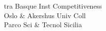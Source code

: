 \documentclass[a4paper]{article}
\begin{document}
\begin{multicols*}{2}
\begin{footnotesize}
tra Basque Inst Competitiveness \\ Oslo \& Akershus Univ Coll \\ Parco Sci \& Tecnol Sicilia 
\end{footnotesize}
\end{multicols*}
\end{document}
